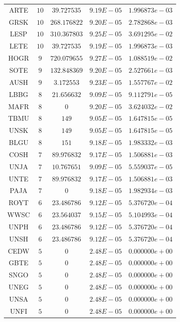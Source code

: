 \documentclass{statsoc}
\begin{document}
\begin{table}
{\begin{tabular}{*{5}{c}}
ARTE  &  $10$  &  $39.727535$  &  $9.19E-05$  &  $1.996873e-03$\\
GRSK  &  $10$  &  $268.176822$  &  $9.20E-05$  &  $2.782868e-03$\\
LESP  &  $10$  &  $310.367803$  &  $9.25E-05$  &  $3.691295e-02$\\
LETE  &  $10$  &  $39.727535$  &  $9.19E-05$  &  $1.996873e-03$\\
HOGR  &  $9$  &  $720.079655$  &  $9.27E-05$  &  $1.088519e-02$\\
SOTE  &  $9$  &  $132.848369$  &  $9.20E-05$  &  $2.527661e-03$\\
AUSH  &  $9$  &  $3.172553$  &  $9.23E-05$  &  $1.557767e-02$\\
LBBG  &  $8$  &  $21.656632$  &  $9.09E-05$  &  $9.112791e-05$\\
MAFR  &  $8$  &  $0$  &  $9.20E-05$  &  $3.624032e-02$\\
TBMU  &  $8$  &  $149$  &  $9.05E-05$  &  $1.647815e-05$\\
UNSK  &  $8$  &  $149$  &  $9.05E-05$  &  $1.647815e-05$\\
BLGU  &  $8$  &  $151$  &  $9.18E-05$  &  $1.983332e-03$\\
COSH  &  $7$  &  $89.976832$  &  $9.17E-05$  &  $1.506881e-03$\\
UNJA  &  $7$  &  $10.767651$  &  $9.09E-05$  &  $5.559037e-05$\\
UNTE  &  $7$  &  $89.976832$  &  $9.17E-05$  &  $1.506881e-03$\\
PAJA  &  $7$  &  $0$  &  $9.18E-05$  &  $1.982934e-03$\\
ROYT  &  $6$  &  $23.486786$  &  $9.12E-05$  &  $5.376720e-04$\\
WWSC  &  $6$  &  $23.564037$  &  $9.15E-05$  &  $5.104993e-04$\\
UNPH  &  $6$  &  $23.486786$  &  $9.12E-05$  &  $5.376720e-04$\\
UNSH  &  $6$  &  $23.486786$  &  $9.12E-05$  &  $5.376720e-04$\\
CEDW  &  $5$  &  $0$  &  $2.48E-05$  &  $0.000000e+00$\\
GBTE  &  $5$  &  $0$  &  $2.48E-05$  &  $0.000000e+00$\\
SNGO  &  $5$  &  $0$  &  $2.48E-05$  &  $0.000000e+00$\\
UNEG  &  $5$  &  $0$  &  $2.48E-05$  &  $0.000000e+00$\\
UNSA  &  $5$  &  $0$  &  $2.48E-05$  &  $0.000000e+00$\\
UNFI  &  $5$  &  $0$  &  $2.48E-05$  &  $0.000000e+00$\\

\end{tabular}}
\end{table}
\end{document}
